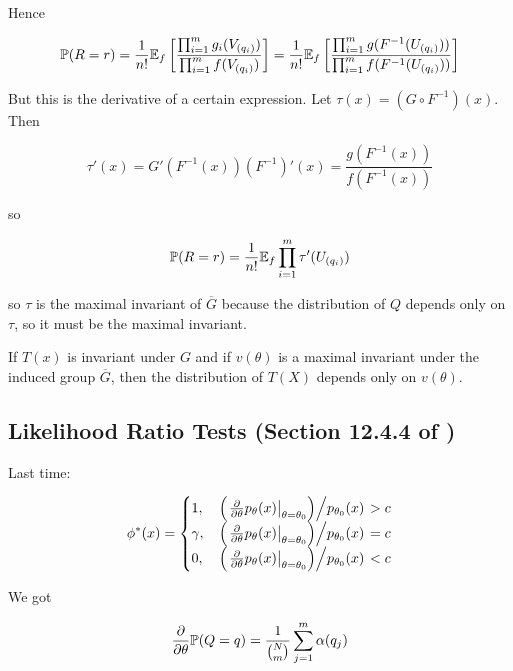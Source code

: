 \begin{example}
Hence

\[
\mathbb{P}(R = r) = \frac{1}{n!} \E_{f} \left[ \frac{ \prod_{i=1}^m g_i(V_{(q_i)}) }{  \prod_{i=1}^m f(V_{(q_i)}) }  \right] = \frac{1}{n!} \E_{f} \left[ \frac{ \prod_{i=1}^m g(F^{-1}(U_{(q_i)}) ) }{  \prod_{i=1}^m f(F^{-1}(U_{(q_i)})) }  \right]
\]

But this is the derivative of a certain expression. Let \(\tau(x) = (G \circ F^{-1})(x)\). Then 

\[
\tau'(x) = G'(F^{-1}(x)) (F^{-1})'(x) = \frac{g(F^{-1}(x)) }{f(F^{-1}(x))}
\]

so


\[
\mathbb{P}(R = r) =  \frac{1}{n!} \E_{f} \prod_{i=1}^m \tau'(U_{(q_i)}) 
\]

so \(\tau\) is the maximal invariant of \(\overline{G}\) because the distribution of \(Q\) depends only on \(\tau\), so it must be the maximal invariant. 

\end{example}

\begin{theorem}

If \(T(x)\) is invariant under \(G\) and if \(v(\theta)\) is a maximal invariant under the induced group \(\overline{G}\), then the distribution of \(T(X)\) depends only on \(v(\theta)\).

\end{theorem}

\subsection{Likelihood Ratio Tests (Section 12.4.4 of \citet{lehmann2005testing})}

Last time:

\[
\phi^*(x) = \begin{cases}
1, & \left. \left(   \left. \pderiv{}{\theta} p_{\theta}(x) \right|_{\theta = \theta_0} \right) \middle/ p_{\theta_0}(x) \right. > c \\
\gamma, & \left. \left(   \left. \pderiv{}{\theta} p_{\theta}(x) \right|_{\theta = \theta_0} \right) \middle/ p_{\theta_0}(x) \right.  = c \\
0, & \left. \left(   \left. \pderiv{}{\theta} p_{\theta}(x) \right|_{\theta = \theta_0} \right) \middle/ p_{\theta_0}(x) \right.  <c
\end{cases}
\]

We got 

\[
\pderiv{}{\theta} \mathbb{P}(Q = q) = \frac{1}{\binom{N}{m}} \sum_{j=1}^m \alpha(q_j)
\]

